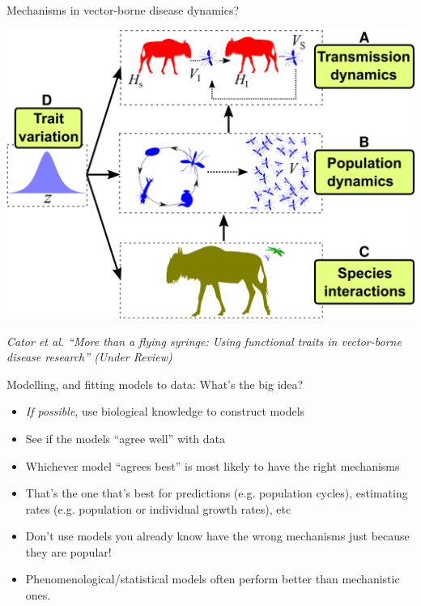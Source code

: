 \documentclass[xcolor=x11names,compress]{beamer}
\renewcommand{\(}{\begin{columns}}
\renewcommand{\)}{\end{columns}}
\newcommand{\<}[1]{\begin{column}{#1}}
\renewcommand{\>}{\end{column}}
\begin{document}
\begin{frame}{Mechanisms in vector-borne disease dynamics?}

	\begin{center}
		\includegraphics[width=.7\textwidth]{VecTraitOverview.png}	
	\end{center}
	
	{\small \it Cator et al. ``More than a flying syringe: Using functional traits in vector-borne disease research'' (Under Review)}

\end{frame}

	
\begin{frame}{Modelling, and fitting models to data: What's the big idea?}

\begin{itemize} [<+->] \itemsep8pt

	\item {\it If possible}, use biological knowledge to construct models
	\item See if the models ``agree well'' with data
	\item Whichever model ``agrees best'' is most likely to have the right 
	mechanisms
	\item That's the one that's best for predictions (e.g. population 
	cycles), estimating rates (e.g. population or individual growth rates), etc
	\item Don't use models you already know have the wrong mechanisms just because they are popular!
	\item Phenomenological/statistical models often perform better than mechanistic ones.    

\end{itemize}
  
\end{frame}
\end{document}
